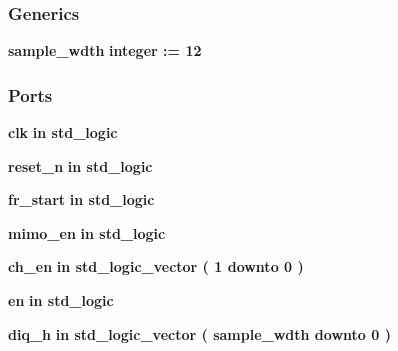 \subsubsection*{Generics}
 \begin{DoxyCompactItemize}
\item 
{\bf sample\+\_\+wdth} {\bfseries {\bfseries \textcolor{comment}{integer}\textcolor{vhdlchar}{ }\textcolor{vhdlchar}{ }\textcolor{vhdlchar}{\+:}\textcolor{vhdlchar}{=}\textcolor{vhdlchar}{ }\textcolor{vhdlchar}{ } \textcolor{vhdldigit}{12} \textcolor{vhdlchar}{ }}}
\end{DoxyCompactItemize}
\subsubsection*{Ports}
 \begin{DoxyCompactItemize}
\item 
{\bf clk}  {\bfseries {\bfseries \textcolor{keywordflow}{in}\textcolor{vhdlchar}{ }}} {\bfseries \textcolor{comment}{std\+\_\+logic}\textcolor{vhdlchar}{ }} 
\item 
{\bf reset\+\_\+n}  {\bfseries {\bfseries \textcolor{keywordflow}{in}\textcolor{vhdlchar}{ }}} {\bfseries \textcolor{comment}{std\+\_\+logic}\textcolor{vhdlchar}{ }} 
\item 
{\bf fr\+\_\+start}  {\bfseries {\bfseries \textcolor{keywordflow}{in}\textcolor{vhdlchar}{ }}} {\bfseries \textcolor{comment}{std\+\_\+logic}\textcolor{vhdlchar}{ }} 
\item 
{\bf mimo\+\_\+en}  {\bfseries {\bfseries \textcolor{keywordflow}{in}\textcolor{vhdlchar}{ }}} {\bfseries \textcolor{comment}{std\+\_\+logic}\textcolor{vhdlchar}{ }} 
\item 
{\bf ch\+\_\+en}  {\bfseries {\bfseries \textcolor{keywordflow}{in}\textcolor{vhdlchar}{ }}} {\bfseries \textcolor{comment}{std\+\_\+logic\+\_\+vector}\textcolor{vhdlchar}{ }\textcolor{vhdlchar}{(}\textcolor{vhdlchar}{ }\textcolor{vhdlchar}{ } \textcolor{vhdldigit}{1} \textcolor{vhdlchar}{ }\textcolor{keywordflow}{downto}\textcolor{vhdlchar}{ }\textcolor{vhdlchar}{ } \textcolor{vhdldigit}{0} \textcolor{vhdlchar}{ }\textcolor{vhdlchar}{)}\textcolor{vhdlchar}{ }} 
\item 
{\bf en}  {\bfseries {\bfseries \textcolor{keywordflow}{in}\textcolor{vhdlchar}{ }}} {\bfseries \textcolor{comment}{std\+\_\+logic}\textcolor{vhdlchar}{ }} 
\item 
{\bf diq\+\_\+h}  {\bfseries {\bfseries \textcolor{keywordflow}{in}\textcolor{vhdlchar}{ }}} {\bfseries \textcolor{comment}{std\+\_\+logic\+\_\+vector}\textcolor{vhdlchar}{ }\textcolor{vhdlchar}{(}\textcolor{vhdlchar}{ }\textcolor{vhdlchar}{ }\textcolor{vhdlchar}{ }\textcolor{vhdlchar}{ }{\bfseries {\bf sample\+\_\+wdth}} \textcolor{vhdlchar}{ }\textcolor{keywordflow}{downto}\textcolor{vhdlchar}{ }\textcolor{vhdlchar}{ } \textcolor{vhdldigit}{0} \textcolor{vhdlchar}{ }\textcolor{vhdlchar}{)}\textcolor{vhdlchar}{ }} 

\end{DoxyCompactItemize}
